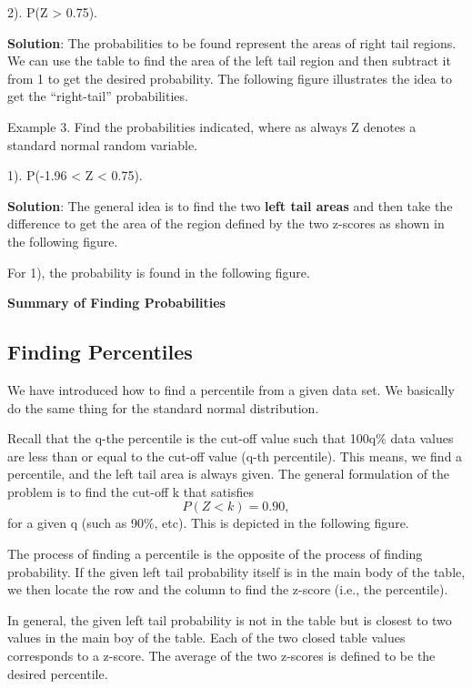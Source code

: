 \documentclass[
]{book}
\begin{document}
2). P(Z \textgreater{} 0.75).

\textbf{Solution}: The probabilities to be found represent the areas of right tail regions. We can use the table to find the area of the left tail region and then subtract it from 1 to get the desired probability. The following figure illustrates the idea to get the ``right-tail'' probabilities.

Example 3. Find the probabilities indicated, where as always Z denotes a standard normal random variable.

1). P(-1.96 \textless{} Z \textless{} 0.75).

\textbf{Solution}: The general idea is to find the two \textbf{left tail areas} and then take the difference to get the area of the region defined by the two z-scores as shown in the following figure.

For 1), the probability is found in the following figure.

\textbf{Summary of Finding Probabilities}

\hfill\break

\hypertarget{finding-percentiles}{%
\subsection{Finding Percentiles}\label{finding-percentiles}}

We have introduced how to find a percentile from a given data set. We basically do the same thing for the standard normal distribution.

Recall that the q-the percentile is the cut-off value such that 100q\% data values are less than or equal to the cut-off value (q-th percentile). This means, we find a percentile, and the left tail area is always given. The general formulation of the problem is to find the cut-off k that satisfies
\[
P(Z < k) = 0.90,
\]
for a given q (such as 90\%, etc). This is depicted in the following figure.

The process of finding a percentile is the opposite of the process of finding probability. If the given left tail probability itself is in the main body of the table, we then locate the row and the column to find the z-score (i.e., the percentile).

In general, the given left tail probability is not in the table but is closest to two values in the main boy of the table. Each of the two closed table values corresponds to a z-score. The average of the two z-scores is defined to be the desired percentile.
\end{document}
